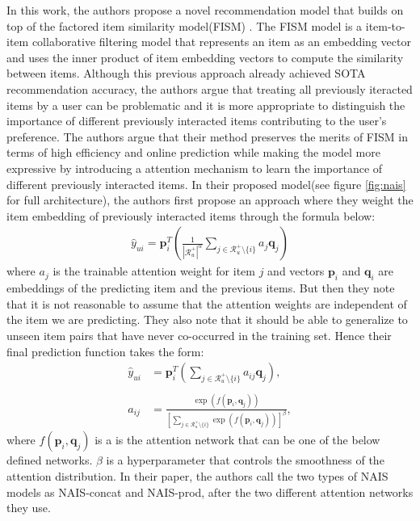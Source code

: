\documentclass{ieeetj}
\begin{document}
In this work, the authors propose a novel recommendation model that builds on top of the factored item similarity model(FISM) \cite{fism1}. The FISM model is a item-to-item collaborative filtering model that represents an item as an embedding vector and uses the inner product of item embedding vectors to compute the similarity between items. Although this previous approach already achieved SOTA recommendation accuracy, the authors argue that treating all previously iteracted items by a user can be problematic and it is more appropriate to distinguish the importance of different previously interacted items contributing to the user's preference. The authors argue that their method preserves the merits of FISM in terms of high efficiency and online prediction while making the model more expressive by introducing a attention mechanism to learn the importance of different previously interacted items. In their proposed model(see figure \ref{fig:nais} for full architecture), the authors first propose an approach where they weight the item embedding of previously interacted items through the formula below: 
\[
\begin{aligned}
	\hat{y}_{ui} = \mathbf{p}_i^T\left(\frac{1}{|\mathcal{R}_u^+|^\alpha}\sum_{j \in \mathcal{R}_u^+ \setminus \{i\}} a_j \mathbf{q}_j\right)
\end{aligned}
\]
where $a_j$ is the trainable attention weight for item $j$ and vectors $\mathbf{p}_i$ and $\mathbf{q}_i$ are embeddings of the predicting item and the previous items. But then they note that it is not reasonable to assume that the attention weights are independent of the item we are predicting. They also note that it should be able to generalize to unseen item pairs that have never co-occurred in the training set. Hence their final prediction function takes the form:
\[
\begin{align*}
		\hat{y}_{ui} &= \mathbf{p}_i^T\left( \sum_{j \in \mathcal{R}_u^+ \setminus \{i\}} a_{ij} \mathbf{q}_j \right), \\\\
		a_{ij} &= \frac{ \exp\left(f(\mathbf{p}_i, \mathbf{q}_j)\right) }
					  { \left[ \sum_{j \in \mathcal{R}_u^+ \setminus \{i\}} \exp\left(f(\mathbf{p}_i, \mathbf{q}_j)\right) \right]^\beta },
\end{align*}
\]
where $f(\mathbf{p}_i, \mathbf{q}_j)$ is a is the attention network that can be one of the below defined networks. $\beta$ is a hyperparameter that controls the smoothness of the attention distribution. In their paper, the authors call the two types of NAIS models as NAIS-concat and NAIS-prod, after the two different attention networks they use. 
\end{document}
